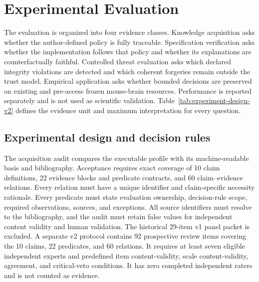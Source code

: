 \section{Experimental Evaluation}
\label{sec:experiments}

The evaluation is organized into four evidence classes. Knowledge acquisition asks whether the author-defined policy is fully traceable. Specification verification asks whether the implementation follows that policy and whether its explanations are counterfactually faithful. Controlled threat evaluation asks which declared integrity violations are detected and which coherent forgeries remain outside the trust model. Empirical application asks whether bounded decisions are preserved on existing and pre-access frozen mouse-brain resources. Performance is reported separately and is not used as scientific validation. Table~\ref{tab:experiment-design-v2} defines the evidence unit and maximum interpretation for every question.



\subsection{Experimental design and decision rules}
\label{subsec:experimental-design}

The acquisition audit compares the executable profile with its machine-readable basis and bibliography. Acceptance requires exact coverage of 10 claim definitions, 22 evidence blocks and predicate contracts, and 60 claim--evidence relations. Every relation must have a unique identifier and claim-specific necessity rationale. Every predicate must state evaluation ownership, decision-rule scope, required observations, sources, and exceptions. All source identifiers must resolve to the bibliography, and the audit must retain false values for independent content validity and human validation. The historical 29-item v1 panel packet is excluded. A separate v2 protocol contains 92 prospective review items covering the 10 claims, 22 predicates, and 60 relations. It requires at least seven eligible independent experts and predefined item content-validity, scale content-validity, agreement, and critical-veto conditions. It has zero completed independent raters and is not counted as evidence.

